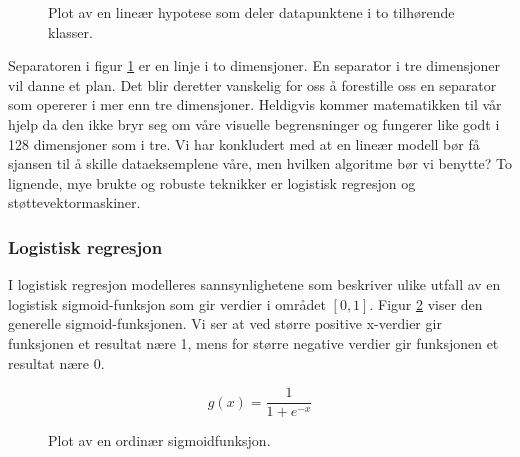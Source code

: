 \begin{figure}[h!]
\centering
{}
\caption{Plot av en lineær hypotese som deler datapunktene i to tilhørende klasser.}
\label{figure:separator}
\end{figure}

Separatoren i figur \ref{figure:separator} er en linje i to dimensjoner. En separator i tre dimensjoner vil danne et plan. Det blir deretter vanskelig for oss å forestille oss en separator som opererer i mer enn tre dimensjoner. Heldigvis kommer matematikken til vår hjelp da den ikke bryr seg om våre visuelle begrensninger og fungerer like godt i 128 dimensjoner som i tre. Vi har konkludert med at en lineær modell bør få sjansen til å skille dataeksemplene våre, men hvilken algoritme bør vi benytte? To lignende, mye brukte og robuste teknikker er logistisk regresjon og støttevektormaskiner.

\subsubsection*{Logistisk regresjon}
I logistisk regresjon modelleres sannsynlighetene som beskriver ulike utfall av en logistisk sigmoid-funksjon som gir verdier i området \([0,1]\). Figur \ref{figure:sigmoid} viser den generelle sigmoid-funksjonen. Vi ser at ved større positive x-verdier gir funksjonen et resultat nære 1, mens for større negative verdier gir funksjonen et resultat nære 0.

\begin{equation}
g(x) = \frac{1}{1 + e^{-x}}
\label{eq:sigmoid}
\end{equation}

\begin{figure}[h!]
\centering
{}
\caption{Plot av en ordinær sigmoidfunksjon.}
\label{figure:sigmoid}
\end{figure}

